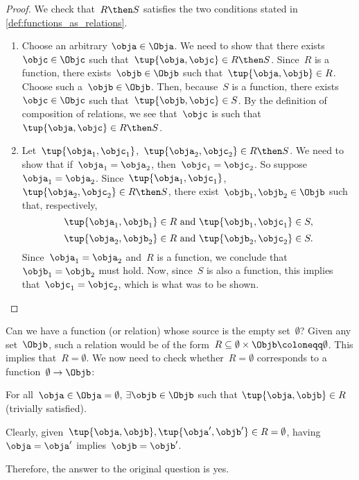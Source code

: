 \begin{proof}
    We check that~$R \then S$ satisfies the two conditions stated in \cref{def:functions_as_relations}.

    \begin{enumerate}
        \item Choose an arbitrary $\obja \in \Obja$. We need to show that there exists~$\objc \in \Objc$ such that~$\tup{\obja,\objc} \in R \then S$. Since~$R$ is a function, there exists~$\objb \in \Objb$ such that~$\tup{\obja,\objb} \in R$. Choose such a~$\objb \in \Objb$. Then, because~$S$ is a function, there exists~$\objc \in \Objc$ such that~$\tup{\objb,\objc} \in S$. By the definition of composition of relations, we see that~$\objc$ is such that~$\tup{\obja,\objc} \in R \then S$.
        \item Let~$\tup{\obja_1, \objc_1}$,~$\tup{\obja_2,\objc_2} \in R \then S$. We need to show that if~$\obja_1 = \obja_2$, then~$\objc_1 = \objc_2$. So suppose~$\obja_1 = \obja_2$. Since~$\tup{\obja_1, \objc_1}$,~$\tup{\obja_2,\objc_2} \in R \then S$, there exist~$\objb_1, \objb_2 \in \Objb$ such that, respectively,
        \begin{equation*}
            \tup{\obja_1, \objb_1} \in R \text{ and } \tup{\objb_1, \objc_1} \in S,
        \end{equation*}
        \begin{equation*}
            \tup{\obja_2, \objb_2} \in R \text{ and } \tup{\objb_2, \objc_2} \in S.
        \end{equation*}
        Since~$\obja_1 = \obja_2$ and~$R$ is a function, we conclude that~$\objb_1 = \objb_2$ must hold. Now, since~$S$ is also a function, this implies that~$\objc_1 = \objc_2$, which is what was to be shown.
    \end{enumerate}
\end{proof}

\begin{example}
    Can we have a function (or relation) whose source is the empty set~$\emptyset$? Given any set~$\Objb$, such a relation would be of the form~$R\subseteq \emptyset \times \Objb \coloneqq \emptyset$. This implies that~$R=\emptyset$. We now need to check whether~$R=\emptyset$ corresponds to a function~$\emptyset\to \Objb$:
    \begin{compactitem}
        \item For all~$\obja\in \Obja=\emptyset$, $\exists \objb \in \Objb$ such that $\tup{\obja,\objb}\in R$ (trivially satisfied).
        \item Clearly, given~$\tup{\obja,\objb}, \tup{\obja',\objb'}\in R=\emptyset$, having~$\obja=\obja'$ implies~$\objb=\objb'$.
    \end{compactitem}
    Therefore, the answer to the original question is yes.
\end{example}

